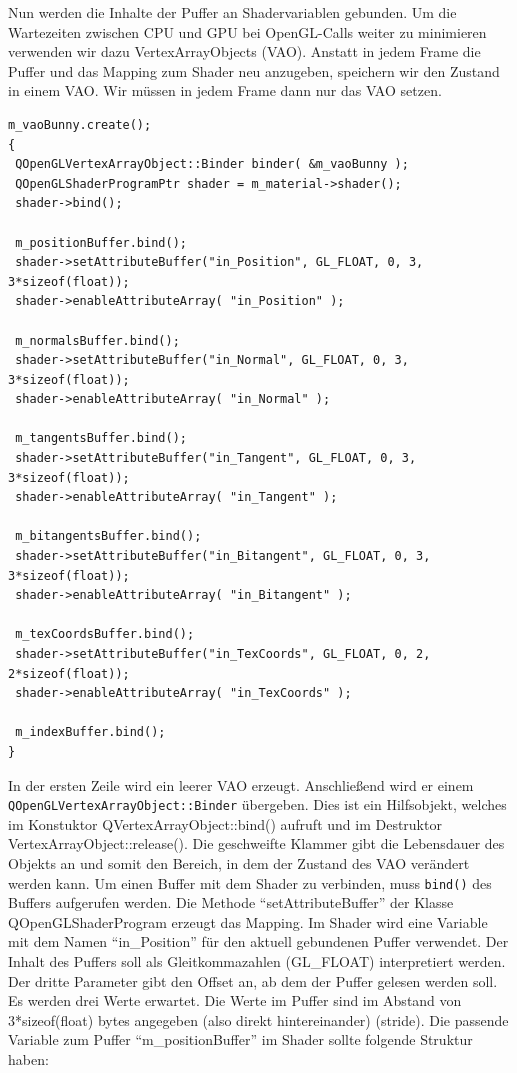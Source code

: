 \documentclass[a4paper,12pt]{article}
\begin{document}
Nun werden die Inhalte der Puffer an Shadervariablen gebunden. Um die Wartezeiten zwischen CPU und GPU bei OpenGL-Calls weiter zu minimieren verwenden wir dazu VertexArrayObjects (VAO). Anstatt in jedem Frame die Puffer und das Mapping zum Shader neu anzugeben, speichern wir den Zustand in einem VAO. Wir müssen in jedem Frame dann nur das VAO setzen.
\begin{lstlisting}[frame=single, columns=fullflexible]
m_vaoBunny.create();
{
 QOpenGLVertexArrayObject::Binder binder( &m_vaoBunny );
 QOpenGLShaderProgramPtr shader = m_material->shader();
 shader->bind();

 m_positionBuffer.bind();
 shader->setAttributeBuffer("in_Position", GL_FLOAT, 0, 3, 3*sizeof(float));
 shader->enableAttributeArray( "in_Position" );

 m_normalsBuffer.bind();
 shader->setAttributeBuffer("in_Normal", GL_FLOAT, 0, 3, 3*sizeof(float));
 shader->enableAttributeArray( "in_Normal" );

 m_tangentsBuffer.bind();
 shader->setAttributeBuffer("in_Tangent", GL_FLOAT, 0, 3, 3*sizeof(float));
 shader->enableAttributeArray( "in_Tangent" );

 m_bitangentsBuffer.bind();
 shader->setAttributeBuffer("in_Bitangent", GL_FLOAT, 0, 3, 3*sizeof(float));
 shader->enableAttributeArray( "in_Bitangent" );

 m_texCoordsBuffer.bind();
 shader->setAttributeBuffer("in_TexCoords", GL_FLOAT, 0, 2, 2*sizeof(float));
 shader->enableAttributeArray( "in_TexCoords" );

 m_indexBuffer.bind();
}
\end{lstlisting}
In der ersten Zeile wird ein leerer VAO erzeugt. Anschließend wird er einem \verb"QOpenGLVertexArrayObject::Binder" übergeben. Dies ist ein Hilfsobjekt, welches im Konstuktor QVertexArrayObject::bind() aufruft und im Destruktor VertexArrayObject::release(). Die geschweifte Klammer gibt die Lebensdauer des Objekts an und somit den Bereich, in dem der Zustand des VAO verändert werden kann.
Um einen Buffer mit dem Shader zu verbinden, muss \verb"bind()" des Buffers aufgerufen werden. Die Methode "`setAttributeBuffer"' der Klasse QOpenGLShaderProgram erzeugt das Mapping. Im Shader wird eine Variable mit dem Namen "`in\_Position"' für den aktuell gebundenen Puffer verwendet. Der Inhalt des Puffers soll als Gleitkommazahlen (GL\_FLOAT) interpretiert werden. Der dritte Parameter gibt den Offset an, ab dem der Puffer gelesen werden soll. Es werden drei Werte erwartet. Die Werte im Puffer sind im Abstand von 3*sizeof(float) bytes angegeben (also direkt hintereinander) (stride).
Die passende Variable zum Puffer "`m\_positionBuffer"' im Shader sollte folgende Struktur haben:
\end{document}

